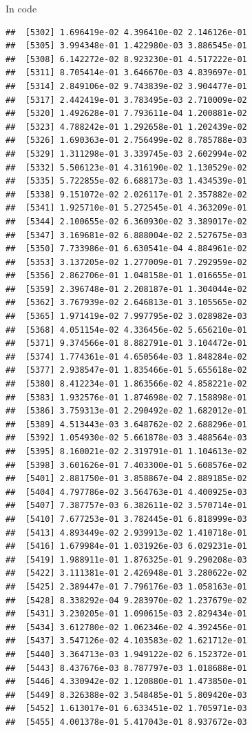\documentclass[ignorenonframetext,]{beamer}
\begin{document}
\begin{frame}[fragile]{In code}
\begin{verbatim}
##  [5302] 1.696419e-02 4.396410e-02 2.146126e-01
##  [5305] 3.994348e-01 1.422980e-03 3.886545e-01
##  [5308] 6.142272e-02 8.923230e-01 4.517222e-01
##  [5311] 8.705414e-01 3.646670e-03 4.839697e-01
##  [5314] 2.849106e-02 9.743839e-02 3.904477e-01
##  [5317] 2.442419e-01 3.783495e-03 2.710009e-02
##  [5320] 1.492628e-01 7.793611e-04 1.200881e-02
##  [5323] 4.788242e-01 1.292658e-01 1.202439e-02
##  [5326] 1.690363e-01 2.756499e-02 8.785788e-03
##  [5329] 1.311298e-01 3.339745e-03 2.602994e-02
##  [5332] 5.506123e-01 4.316190e-02 1.130529e-02
##  [5335] 5.722855e-02 6.688173e-03 1.434539e-01
##  [5338] 9.151072e-02 2.026117e-01 2.357882e-02
##  [5341] 1.925710e-01 5.272545e-01 4.363209e-01
##  [5344] 2.100655e-02 6.360930e-02 3.389017e-02
##  [5347] 3.169681e-02 6.888004e-02 2.527675e-03
##  [5350] 7.733986e-01 6.630541e-04 4.884961e-02
##  [5353] 3.137205e-02 1.277009e-01 7.292959e-02
##  [5356] 2.862706e-01 1.048158e-01 1.016655e-01
##  [5359] 2.396748e-01 2.208187e-01 1.304044e-02
##  [5362] 3.767939e-02 2.646813e-01 3.105565e-02
##  [5365] 1.971419e-02 7.997795e-02 3.028982e-03
##  [5368] 4.051154e-02 4.336456e-02 5.656210e-01
##  [5371] 9.374566e-01 8.882791e-01 3.104472e-01
##  [5374] 1.774361e-01 4.650564e-03 1.848284e-02
##  [5377] 2.938547e-01 1.835466e-01 5.655618e-02
##  [5380] 8.412234e-01 1.863566e-02 4.858221e-02
##  [5383] 1.932576e-01 1.874698e-02 7.158898e-01
##  [5386] 3.759313e-01 2.290492e-02 1.682012e-01
##  [5389] 4.513443e-03 3.648762e-02 2.688296e-01
##  [5392] 1.054930e-02 5.661878e-03 3.488564e-03
##  [5395] 8.160021e-02 2.319791e-01 1.104613e-02
##  [5398] 3.601626e-01 7.403300e-01 5.608576e-02
##  [5401] 2.881750e-01 3.858867e-04 2.889185e-02
##  [5404] 4.797786e-02 3.564763e-01 4.400925e-03
##  [5407] 7.387757e-03 6.382611e-02 3.570714e-01
##  [5410] 7.677253e-01 3.782445e-01 6.818999e-03
##  [5413] 4.893449e-02 2.939913e-02 1.410718e-01
##  [5416] 1.679984e-01 1.031926e-03 6.029231e-01
##  [5419] 1.988911e-01 1.876325e-01 9.290208e-03
##  [5422] 3.111381e-01 2.426948e-01 3.280622e-02
##  [5425] 2.389447e-01 7.796176e-03 1.058163e-01
##  [5428] 8.338292e-04 9.283970e-02 1.237679e-02
##  [5431] 3.230205e-01 1.090615e-03 2.829434e-01
##  [5434] 3.612780e-02 1.062346e-02 4.392456e-01
##  [5437] 3.547126e-02 4.103583e-02 1.621712e-01
##  [5440] 3.364713e-03 1.949122e-02 6.152372e-01
##  [5443] 8.437676e-03 8.787797e-03 1.018688e-01
##  [5446] 4.330942e-02 1.120880e-01 1.473850e-01
##  [5449] 8.326388e-02 3.548485e-01 5.809420e-03
##  [5452] 1.613017e-01 6.633451e-02 1.705971e-03
##  [5455] 4.001378e-01 5.417043e-01 8.937672e-03

\end{verbatim}
\end{frame}
\end{document}
